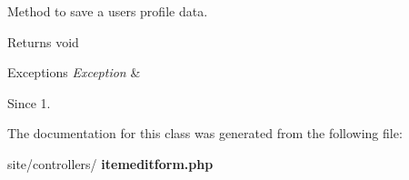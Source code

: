 Method to save a user\textquotesingle{}s profile data.

\begin{DoxyReturn}{Returns}
void
\end{DoxyReturn}

\begin{DoxyExceptions}{Exceptions}
{\em Exception} & \\
\hline
\end{DoxyExceptions}
\begin{DoxySince}{Since}
1. 
\end{DoxySince}


The documentation for this class was generated from the following file\+:\begin{DoxyCompactItemize}
\item 
site/controllers/\textbf{ itemeditform.\+php}\end{DoxyCompactItemize}
